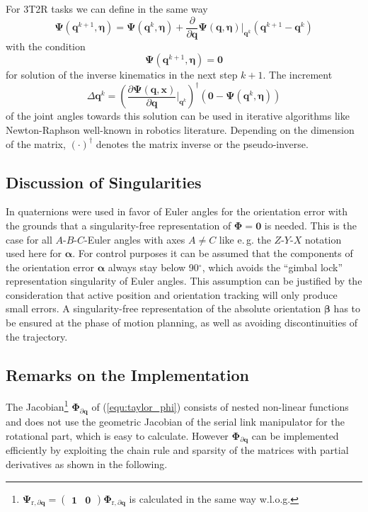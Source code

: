 \documentclass[twocolumn,10pt]{IFTOMM}
\newcommand{\bm}[1]{\boldsymbol{#1}}
\begin{document}
For 3T2R tasks we can define in the same way
%
\begin{equation}
\bm{\Psi}(\bm{q}^{k+1},\bm{\eta}) = 
\bm{\Psi}(\bm{q}^{k},\bm{\eta})
+
\frac{\partial}{\partial \bm{q}} \bm{\Psi}(\bm{q},\bm{\eta}) \biggr\rvert_{\bm{q}^k} (\bm{q}^{k+1} - \bm{q}^k)
\end{equation}
%
with the condition
%
\begin{equation}
\bm{\Psi}(\bm{q}^{k+1},\bm{\eta})=\bm{0}
\end{equation}
%
for solution of the inverse kinematics in the next step $k+1$. The increment 
%
\begin{equation}
\Delta \bm{q}^k
=
\left(\frac{\partial \bm{\Psi}(\bm{q},\bm{x})}{\partial \bm{q}}\biggr\rvert_{\bm{q}^k}\right)^{\dagger}
(\bm{0} - \bm{\Psi}(\bm{q}^{k},\bm{\eta}))
\label{equ:deltaq_psi}
\end{equation}
%
of the joint angles towards this solution can be used in iterative algorithms like Newton-Raphson well-known in robotics literature.
Depending on the dimension of the matrix, $(\cdot)^\dagger$ denotes the matrix inverse or the pseudo-inverse.

\subsection{Discussion of Singularities}

In \cite{Zlajpah2017} quaternions were used in favor of Euler angles for the orientation error with the grounds that a singularity-free representation of $\bm{\Phi}=\bm{0}$ is needed.
This is the case for all $A$-$B$-$C$-Euler angles with axes $A \ne C$ like e.\,g. the $Z$-$Y$-$X$ notation used here for $\bm{\alpha}$.
For control purposes it can be assumed that the components of the orientation error $\bm{\alpha}$ always stay below 90$^\circ$, which avoids the ``gimbal lock'' representation singularity of Euler angles.
This assumption can be justified by the consideration that active position and orientation tracking will only produce small errors.
A singularity-free representation of the absolute orientation $\bm{\beta}$ has to be ensured at the phase of motion planning, as well as avoiding discontinuities of the trajectory.

\subsection{Remarks on the Implementation}
\label{sec:RecEulAng_implement}

The Jacobian\footnote{$\bm{\Psi}_{\mathrm{r},\partial\bm{q}}=\begin{pmatrix} \bm{1} & \bm{0}\end{pmatrix} \bm{\Phi}_{\mathrm{r},\partial\bm{q}}$ is calculated in the same way w.l.o.g.}
$\bm{\Phi}_{\partial\bm{q}}$ of (\ref{equ:taylor_phi}) consists of nested non-linear functions and does not use the geometric Jacobian of the serial link manipulator for the rotational part, which is easy to calculate. 
%
However $\bm{\Phi}_{\partial\bm{q}}$ can be implemented efficiently by exploiting the chain rule and sparsity of the matrices with partial derivatives as shown in the following.
\end{document}
